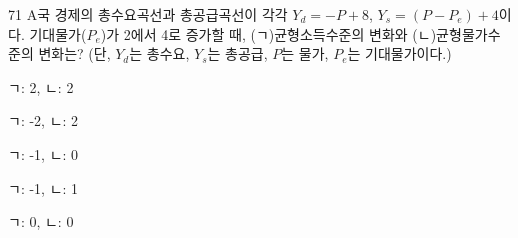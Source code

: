 \begin{question}{71}
A국 경제의 총수요곡선과 총공급곡선이 각각 $Y_d = -P + 8$, $Y_s = (P - P_e) + 4$이다. 기대물가($P_e$)가 2에서 4로 증가할 때, (ㄱ)균형소득수준의 변화와 (ㄴ)균형물가수준의 변화는? (단, $Y_d$는 총수요, $Y_s$는 총공급, $P$는 물가, $P_e$는 기대물가이다.)
\begin{choices}
  \item ㄱ: 2, ㄴ: 2
  \item ㄱ: -2, ㄴ: 2
  \item ㄱ: -1, ㄴ: 0
  \item ㄱ: -1, ㄴ: 1
  \item ㄱ: 0, ㄴ: 0
\end{choices}
\end{question}
